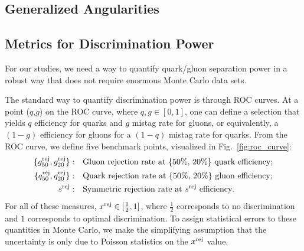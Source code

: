 \documentclass[11pt,letterpaper]{article}
\DeclareRobustCommand{\Fig}[1]{Fig.~\ref{#1}}
\begin{document}
\subsection{Generalized Angularities}

\subsection{Metrics for Discrimination Power}

For our studies, we need a way to quantify quark/gluon separation power in a robust way that does not require enormous Monte Carlo data sets.

The standard way to quantify discrimination power is through ROC curves.  At a point ($q$,$g$) on the ROC curve, where $q,g \in [0,1]$, one can define a selection that yields $q$ efficiency for quarks and $g$ mistag rate for gluons, or equivalently, a $(1-g)$ efficiency for gluons for a $(1-q)$ mistag rate for quarks.  From the ROC curve, we define five benchmark points, visualized in \Fig{fig:roc_curve}:
\begin{align}
\{ g^{\rm  rej}_{50} ,   g^{\rm  rej}_{20}\} : \quad & \text{Gluon rejection rate at \{50\%, 20\%\} quark efficiency}; \\
\{q^{\rm rej}_{50} ,  q^{\rm rej}_{20}\} : \quad & \text{Quark rejection rate at \{50\%, 20\%\} gluon efficiency}; \\
s^{\rm rej} : \quad & \text{Symmetric rejection rate at $s^{\rm rej}$ efficiency}.
\end{align}
For all of these measures, $x^{\rm rej} \in [\frac{1}{2},1]$, where $\frac{1}{2}$ corresponds to no discrimination and $1$ corresponds to optimal discrimination.  To assign statistical errors to these quantities in Monte Carlo, we make the simplifying assumption that the uncertainty is only due to Poisson statistics on the $x^{\rm rej}$ value.
\end{document}
